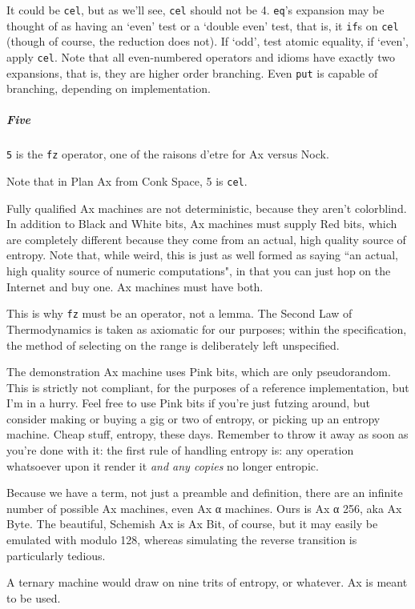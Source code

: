 \documentclass[twoside]{article}
\begin{document}
It could be \texttt{cel}, but as we'll see, \texttt{cel} should not be 4. \texttt{eq}'s expansion may be thought of as having an `even' test or a `double even' test, that is, it \texttt{if}s on \texttt{cel} (though of course, the reduction does not). If `odd', test atomic equality, if `even', apply \texttt{cel}. 
Note that all even-numbered operators and idioms have exactly two expansions, that is, they are higher order branching. Even \texttt{put} is capable of branching, depending on implementation.

\subparagraph{Five}

\texttt{5} is the \texttt{fz} operator, one of the raisons d'etre for Ax versus Nock.

Note that in Plan Ax from Conk Space, 5 is \texttt{cel}. 

Fully qualified Ax machines are not deterministic, because they aren't colorblind. In addition to Black and White bits, Ax machines must supply Red bits, which are completely different because they come from an actual, high quality source of entropy. Note that, while weird, this is just as well formed as saying ``an actual, high quality source of numeric computations", in that you can just hop on the Internet and buy one. Ax machines must have both.

This is why \texttt{fz} must be an operator, not a lemma. The Second Law of Thermodynamics is taken as axiomatic for our purposes; within the specification, the method of selecting on the range is deliberately left unspecified.

The demonstration Ax machine uses Pink bits, which are only pseudorandom. This is strictly not compliant, for the purposes of a reference implementation, but I'm in a hurry. Feel free to use Pink bits if you're just futzing around, but consider making or buying a gig or two of entropy, or picking up an entropy machine. Cheap stuff, entropy, these days. Remember to throw it away as soon as you're done with it: the first rule of handling entropy is: any operation whatsoever upon it render it \emph{and any copies} no longer entropic.

Because we have a term, not just a preamble and definition, there are an infinite number of possible Ax machines, even Ax α machines. Ours is Ax α 256, aka Ax Byte. The beautiful, Schemish Ax is Ax Bit, of course, but it may easily be emulated with modulo 128, whereas simulating the reverse transition is particularly tedious.

A ternary machine would draw on nine trits of entropy, or whatever. Ax is meant to be used. 
\end{document}
